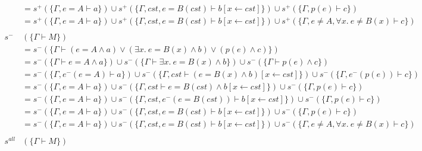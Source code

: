 \documentclass[12pt]{article}
\begin{document}
\begin{align*}
          & = s^+ (\{\Gamma, e = A \vdash a\}) \cup s^+ (\{\Gamma, cst, e = B(cst) \vdash b[x\leftarrow cst]\}) \cup s^+ (\{\Gamma, p(e) \vdash c\})                                                           \\
          & = s^+ (\{\Gamma, e = A \vdash a\}) \cup s^+ (\{\Gamma, cst, e = B(cst) \vdash b[x\leftarrow cst]\}) \cup s^+ (\{\Gamma, e \neq A, \forall x.~ e \neq B(x) \vdash c\})                              \\
  \\
  s^-     & (\{\Gamma \vdash M\})                                                                                                                                                                              \\
          & = s^- (\{\Gamma \vdash (e = A \land a ) \lor (\exists x.~ e = B(x) \land b ) \lor (p(e) \land c )\})                                                                                               \\
          & = s^- (\{\Gamma \vdash e = A \land a\}) \cup s^- (\{\Gamma \vdash \exists x.~ e = B(x) \land b\}) \cup s^- (\{\Gamma \vdash p(e) \land c\})                                                        \\
          & =  s^- (\{\Gamma, e^- (e = A)\vdash a\}) \cup s^- (\{\Gamma, cst \vdash (e = B(x) \land b)[x\leftarrow cst]\}) \cup s^- (\{\Gamma, e^- (p(e)) \vdash c\})                                          \\
          & =  s^- (\{\Gamma, e = A \vdash a\}) \cup s^- (\{\Gamma, cst \vdash e = B(cst) \land b[x\leftarrow cst]\}) \cup s^- (\{\Gamma, p(e) \vdash c\})                                                     \\
          & =  s^- (\{\Gamma, e = A \vdash a\}) \cup s^- (\{\Gamma, cst, e^- (e = B(cst))\vdash b[x\leftarrow cst]\}) \cup s^- (\{\Gamma, p(e) \vdash c\})                                                     \\
          & =  s^- (\{\Gamma, e = A \vdash a\}) \cup s^- (\{\Gamma, cst, e = B(cst)\vdash b[x\leftarrow cst]\}) \cup s^- (\{\Gamma, p(e) \vdash c\})                                                           \\
          & =  s^- (\{\Gamma, e = A \vdash a\}) \cup s^- (\{\Gamma, cst, e = B(cst)\vdash b[x\leftarrow cst]\}) \cup s^- (\{\Gamma, e \neq A, \forall x.~ e \neq B(x) \vdash c\})                              \\
  \\
  s^{all} & (\{\Gamma \vdash M\})                                                                                                                                                                              \\

\end{align*}
\end{document}
